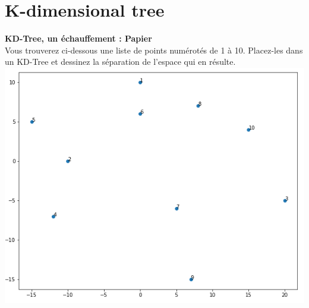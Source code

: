 \section{K-dimensional tree}

\begin{Exercice}[5 minutes]\textbf{KD-Tree, un échauffement : Papier}\\
Vous trouverez ci-dessous une liste de points numérotés de 1 à 10. Placez-les dans un KD-Tree et dessinez la séparation de l'espace qui en résulte.\\

\includegraphics[]{KD_points.PNG}


\end{Exercice}
